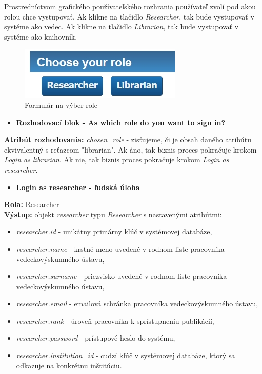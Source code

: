 \documentclass[10pt,oneside,slovak,a4paper]{article}
\begin{document}
Prostredníctvom grafického používateľského rozhrania používateľ zvolí pod akou rolou chce vystupovať. Ak klikne na tlačidlo \textit{Researcher}, tak bude vystupovať v systéme ako vedec. Ak klikne na tlačidlo \textit{Librarian}, tak bude vystupovať v systéme ako knihovník.

\begin{figure} [H]
\centering
\includegraphics[scale=0.7]{forms/formChooseRole.jpg} 
\caption{Formulár na výber role}
\end{figure}

\begin{itemize}
\item \textbf{Rozhodovací blok - As which role do you want to sign in?}
\end{itemize}

\textbf{Atribút rozhodovania:} \textit{chosen\_role} - zisťujeme, či je obsah daného atribútu ekvivalentný s reťazcom "librarian". Ak áno, tak biznis proces pokračuje krokom \textit{Login as librarian}. Ak nie, tak biznis proces pokračuje krokom \textit{Login as researcher}.

\begin{itemize}
\item \textbf{Login as researcher - ľudská úloha}
\end{itemize}

\textbf{Rola:} Researcher\\
\textbf{Výstup:} objekt \textit{researcher} typu \textit{Researcher} s nastavenými atribútmi:

\begin{itemize}
\item \textit{researcher.id} - unikátny primárny kľúč v systémovej databáze,
\item \textit{researcher.name} - krstné meno uvedené v rodnom liste pracovníka vedeckovýskumného ústavu,
\item \textit{researcher.surname} -  priezvisko uvedené v rodnom liste pracovníka vedeckovýskumného ústavu,
\item \textit{researcher.email} - emailová schránka pracovníka vedeckovýskumného ústavu,
\item \textit{researcher.rank} - úroveň pracovníka k sprístupneniu publikácií,
\item \textit{researcher.password} - prístupové heslo do systému,
\item \textit{researcher.institution\_id} - cudzí kľúč v systémovej databáze, ktorý sa odkazuje na konkrétnu inštitúciu.
\end{itemize}
\end{document}
